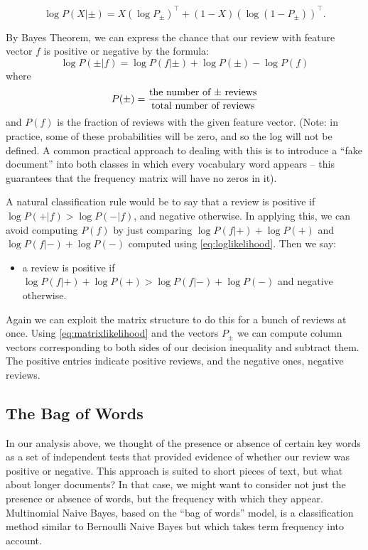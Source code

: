 \documentclass[
]{article}
\providecommand{\tightlist}{%
  \setlength{\itemsep}{0pt}\setlength{\parskip}{0pt}}
\begin{document}
\begin{equation}
\log P(X|\pm) = X(\log P_{\pm})^{\intercal}+(1-X)(\log (1-P_{\pm}))^{\intercal}.
\label{eq:matrixlikelihood}\end{equation}

By Bayes Theorem, we can express the chance that our review with feature
vector \(f\) is positive or negative by the formula: \[
\log P(\pm|f) = \log P(f|\pm)+\log P(\pm) - \log P(f)
\] where \[
P(\pm) = \frac{\hbox{\rm the number of $\pm$ reviews}}{\hbox{\rm total number of reviews}}
\] and \(P(f)\) is the fraction of reviews with the given feature
vector. (Note: in practice, some of these probabilities will be zero,
and so the log will not be defined. A common practical approach to
dealing with this is to introduce a ``fake document'' into both classes
in which every vocabulary word appears -- this guarantees that the
frequency matrix will have no zeros in it).

A natural classification rule would be to say that a review is positive
if \(\log P(+|f)>\log P(-|f)\), and negative otherwise. In applying
this, we can avoid computing \(P(f)\) by just comparing
\(\log P(f|+)+\log P(+)\) and \(\log P(f|-)+\log P(-)\) computed using
\cref{eq:loglikelihood}. Then we say:

\begin{itemize}
\tightlist
\item
  a review is positive if
  \(\log P(f|+)+\log P(+)>\log P(f|-)+\log P(-)\) and negative
  otherwise.
\end{itemize}

Again we can exploit the matrix structure to do this for a bunch of
reviews at once. Using \cref{eq:matrixlikelihood} and the vectors
\(P_{\pm}\) we can compute column vectors corresponding to both sides of
our decision inequality and subtract them. The positive entries indicate
positive reviews, and the negative ones, negative reviews.

\hypertarget{the-bag-of-words}{%
\subsection{The Bag of Words}\label{the-bag-of-words}}

In our analysis above, we thought of the presence or absence of certain
key words as a set of independent tests that provided evidence of
whether our review was positive or negative. This approach is suited to
short pieces of text, but what about longer documents? In that case, we
might want to consider not just the presence or absence of words, but
the frequency with which they appear. Multinomial Naive Bayes, based on
the ``bag of words'' model, is a classification method similar to
Bernoulli Naive Bayes but which takes term frequency into account.
\end{document}
